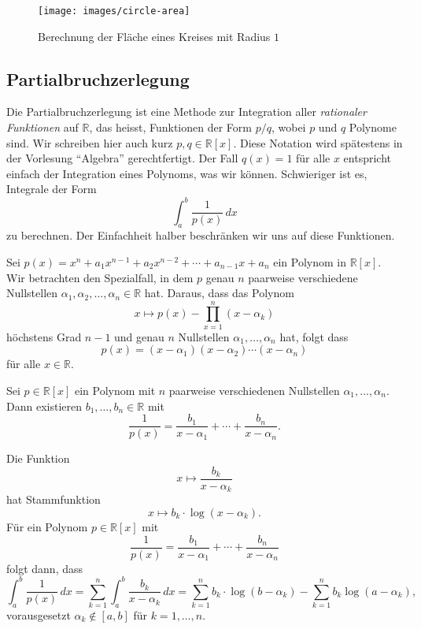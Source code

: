\documentclass[../main.tex]{subfiles}
\begin{document}
\begin{figure}[htb]
  \centering
  \texttt{[image: images/circle-area]}
  \caption{Berechnung der Fläche eines Kreises mit Radius $1$}%
  \label{fig:circle-area}
\end{figure}

\subsection*{Partialbruchzerlegung}
Die Partialbruchzerlegung ist eine Methode
zur Integration aller \emph{rationaler Funktionen}
auf $\mathbb{R}$,
das heisst, Funktionen der Form
$p/q$, wobei $p$ und $q$ Polynome sind.
Wir schreiben hier auch kurz $p, q \in \mathbb{R}[x]$.
Diese Notation wird spätestens in der Vorlesung
``Algebra'' gerechtfertigt.
Der Fall $q(x) = 1$ für alle $x$ entspricht einfach
der Integration eines Polynoms, was wir können.
Schwieriger ist es, Integrale der Form
\[
  \int_{a}^{b} \frac{1}{p(x)} \, dx
\]
zu berechnen.
Der Einfachheit halber beschränken wir uns auf diese Funktionen.

Sei
\(
  p(x) = x^n + a_1 x^{n-1} + a_2 x^{n-2} + \cdots
  + a_{n-1} x + a_n
\)
ein Polynom in $\mathbb{R}[x]$.
Wir betrachten den Spezialfall,
in dem $p$ genau $n$ paarweise verschiedene
Nullstellen $\alpha_1, \alpha_2, \dots, \alpha_n \in \mathbb{R}$
hat.
Daraus, dass das Polynom
\[
  x \mapsto p(x) - \prod_{x=1}^{n} (x - \alpha_k)
\]
höchstens Grad $n-1$ und genau $n$ Nullstellen
$\alpha_1, \dots, \alpha_n$ hat, folgt dass
\[
  p(x) = (x - \alpha_1) (x - \alpha_2) \cdots (x - \alpha_n)
\]
für alle $x \in \mathbb{R}$.

\begin{lemma}[Partialbruchzerlegung]\label{lem:partial-fractions}
  Sei $p \in \mathbb{R}[x]$ ein Polynom mit $n$
  paarweise verschiedenen Nullstellen
  $\alpha_1, \dots, \alpha_n$.
  Dann existieren $b_1, \dots, b_n \in \mathbb{R}$
  mit
  \[
    \frac{1}{p(x)} = \frac{b_1}{x - \alpha_1}
    + \cdots + \frac{b_n}{x - \alpha_n}.
  \]
\end{lemma}

\begin{application}
  Die Funktion
  \[
    x \mapsto \frac{b_k}{x - \alpha_k}
  \]
  hat Stammfunktion
  \[
    x \mapsto b_k \cdot \log (x - \alpha_k).
  \]
  Für ein Polynom $p \in \mathbb{R}[x]$ mit
  \[
    \frac{1}{p(x)} = \frac{b_1}{x - \alpha_1}
    + \cdots + \frac{b_n}{x - \alpha_n}
  \]
  folgt dann, dass
  \[
    \int_{a}^{b} \frac{1}{p(x)} \, dx
    = \sum_{k=1}^{n} \int_{a}^{b} \frac{b_k}{x - \alpha_k} \, dx
    = \sum_{k=1}^{n} b_k \cdot \log(b - \alpha_k)
    - \sum_{k=1}^{n} b_k \log(a - \alpha_k), %
  \]
  vorausgesetzt $\alpha_k \notin [a, b]$ für $k = 1, \dots, n$.
\end{application}
\end{document}
